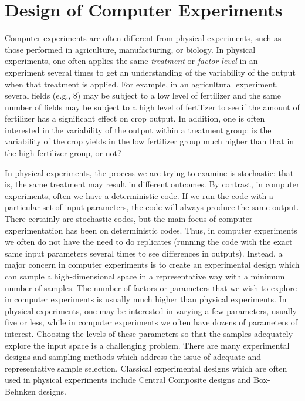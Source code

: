 \section{Design of Computer Experiments}\label{dace:background}

Computer experiments are often different from physical experiments,
such as those performed in agriculture, manufacturing, or biology.  In
physical experiments, one often applies the same \emph{treatment} or
\emph{factor level} in an experiment several times to get an
understanding of the variability of the output when that treatment is
applied.  For example, in an agricultural experiment, several fields
(e.g., 8) may be subject to a low level of fertilizer and the same
number of fields may be subject to a high level of fertilizer to see
if the amount of fertilizer has a significant effect on crop
output. In addition, one is often interested in the variability of the
output within a treatment group: is the variability of the crop yields
in the low fertilizer group much higher than that in the high
fertilizer group, or not?

In physical experiments, the process we are trying to examine is stochastic:  
that is, the same treatment may result in different outcomes.  
By contrast, in computer experiments, often we have a deterministic code.  
If we run the code with a particular set of input parameters, the code 
will always produce the same output.  There certainly are stochastic codes, 
but the main focus of computer experimentation has been on deterministic codes. 
Thus, in computer experiments we often do not have the need to do replicates 
(running the code with the exact same input parameters several times to see 
differences in outputs).  Instead, a major concern in computer experiments is 
to create an experimental design which can sample a high-dimensional space 
in a representative way with a minimum number of samples.   
The number of factors or parameters that we wish to explore in computer 
experiments is usually much higher than physical experiments.  
In physical experiments, one may be interested in varying a few parameters, 
usually five or less, while in computer experiments we often have 
dozens of parameters of interest.  Choosing the levels of these parameters 
so that the samples adequately explore the input space is a challenging 
problem.  There are many experimental designs and sampling methods 
which address the issue of adequate and representative sample selection. 
Classical experimental designs which are often used in physical experiments 
include Central Composite designs and Box-Behnken designs.

